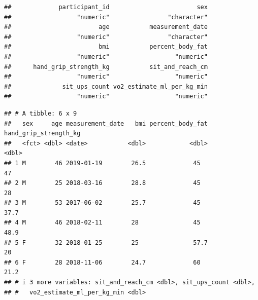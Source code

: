 \documentclass[
]{article}
\newenvironment{Shaded}{\begin{snugshade}}{\end{snugshade}}
\newcommand{\ControlFlowTok}[1]{\textcolor[rgb]{0.13,0.29,0.53}{\textbf{#1}}}
\newcommand{\FunctionTok}[1]{\textcolor[rgb]{0.13,0.29,0.53}{\textbf{#1}}}
\newcommand{\NormalTok}[1]{#1}
\newcommand{\OtherTok}[1]{\textcolor[rgb]{0.56,0.35,0.01}{#1}}
\newcommand{\SpecialCharTok}[1]{\textcolor[rgb]{0.81,0.36,0.00}{\textbf{#1}}}
\newcommand{\StringTok}[1]{\textcolor[rgb]{0.31,0.60,0.02}{#1}}
\begin{document}
\begin{verbatim}
##             participant_id                        sex 
##                  "numeric"                "character" 
##                        age           measurement_date 
##                  "numeric"                "character" 
##                        bmi           percent_body_fat 
##                  "numeric"                  "numeric" 
##      hand_grip_strength_kg           sit_and_reach_cm 
##                  "numeric"                  "numeric" 
##              sit_ups_count vo2_estimate_ml_per_kg_min 
##                  "numeric"                  "numeric"
\end{verbatim}

\begin{Shaded}
\end{Shaded}

\begin{verbatim}
## # A tibble: 6 x 9
##   sex     age measurement_date   bmi percent_body_fat hand_grip_strength_kg
##   <fct> <dbl> <date>           <dbl>            <dbl>                 <dbl>
## 1 M        46 2019-01-19        26.5             45                    47  
## 2 M        25 2018-03-16        28.8             45                    28  
## 3 M        53 2017-06-02        25.7             45                    37.7
## 4 M        46 2018-02-11        28               45                    48.9
## 5 F        32 2018-01-25        25               57.7                  20  
## 6 F        28 2018-11-06        24.7             60                    21.2
## # i 3 more variables: sit_and_reach_cm <dbl>, sit_ups_count <dbl>,
## #   vo2_estimate_ml_per_kg_min <dbl>
\end{verbatim}
\end{document}
